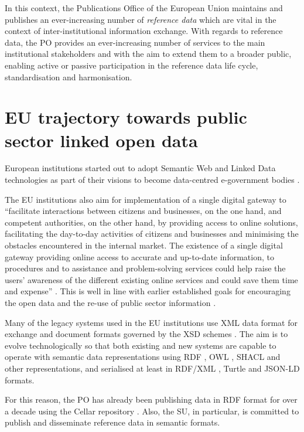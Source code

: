 	In this context, the Publications Office of the European Union maintains and publishes an ever-increasing number of \textit{reference data} which are vital in the context of inter-institutional information exchange. With regards to reference data, the PO provides an ever-increasing number of services to the main institutional stakeholders and with the aim to extend them to a broader public, enabling active or passive participation in the reference data life cycle, standardisation and harmonisation.

	\section{EU trajectory towards public sector linked open data}
	
	European institutions started out to adopt Semantic Web and Linked Data technologies as part of their visions to become data-centred e-government bodies \citep{decission-456/2005/EC,decission-2015/2240}. 
	
	The EU institutions also aim for implementation of a single digital gateway to ``facilitate interactions between citizens and businesses, on the one hand, and competent authorities, on the other hand, by providing access to online solutions, facilitating the day-to-day activities of citizens and businesses and minimising the obstacles encountered in the internal market. The existence of a single digital gateway providing online access to accurate and up-to-date information, to procedures and to assistance and problem-solving services could help raise the users' awareness of the different existing online services and could save them time and expense'' \citep{directive-2018/1724}. This is well in line with earlier established goals for encouraging the open data and the re-use of public sector information \citep{directive-2013/37/EU,directive-2019/1024}.

	Many of the legacy systems used in the EU institutions use XML data format for exchange and document formats governed by the XSD schemes \citep{xsd1.1-spec}. The aim is to evolve technologically so that both existing and new systems are capable to operate with semantic data representations using RDF \citep{rdf11}, OWL \citep{owl2.0,owl2}, SHACL \citep{shacl-spec} and other representations, and serialised at least in RDF/XML \citep{rdf-xml-Beckett:04:RSS,rdf-xml-Schreiber:14:RXS}, Turtle \citep{turtle-Carothers:14:RT} and JSON-LD \citep{spornyjson,sporny2014json} formats.
	
	For this reason, the PO has already been publishing data in RDF format for over a decade using the Cellar repository \citep{cdm-francesconi2015ontology}. Also, the SU, in particular, is committed to publish and disseminate reference data in semantic formats. 
	
